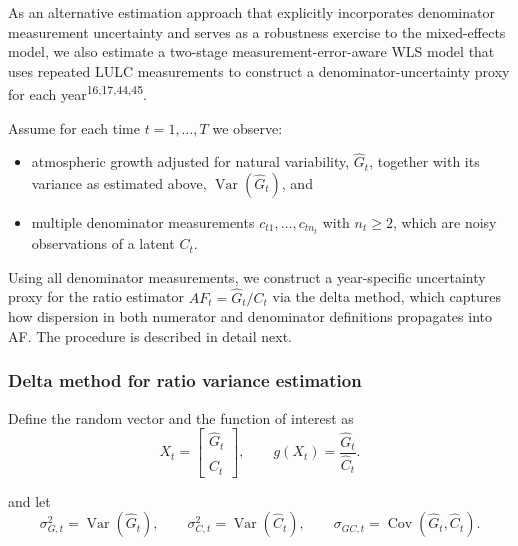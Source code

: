 \documentclass[
  12pt,
  letterpaper,
  DIV=11,
  numbers=noendperiod]{scrartcl}
\begin{document}
As an alternative estimation approach that explicitly incorporates
denominator measurement uncertainty and serves as a robustness exercise
to the mixed-effects model, we also estimate a two-stage
measurement-error-aware WLS model that uses repeated LULC measurements
to construct a denominator-uncertainty proxy for each
year\textsuperscript{16,17,44,45}.

Assume for each time \(t=1,\dots,T\) we observe:

\begin{itemize}
\item
  atmospheric growth adjusted for natural variability, \(\hat{G}_t\),
  together with its variance as estimated above,
  \(\operatorname{Var}(\hat{G}_t)\), and
\item
  multiple denominator measurements \(c_{t1},\dots,c_{t n_t}\) with
  \(n_t \ge 2\), which are noisy observations of a latent \(C_t\).
\end{itemize}

Using all denominator measurements, we construct a year-specific
uncertainty proxy for the ratio estimator \(AF_t = \hat{G}_t/C_t\) via
the delta method, which captures how dispersion in both numerator and
denominator definitions propagates into AF. The procedure is described
in detail next.

\subsubsection*{Delta method for ratio variance
estimation}\label{delta-method-for-ratio-variance-estimation}

Define the random vector and the function of interest as \[
X_t=
\begin{bmatrix}
\hat{G}_t\\
\hat C_t
\end{bmatrix},
\qquad
g(X_t)=\frac{\hat{G}_t}{\hat C_t}.
\]

and let \[
\sigma_{G,t}^2 = \operatorname{Var}(\hat{G}_t),\qquad \sigma_{C,t}^2 = \operatorname{Var}(\hat C_t),\qquad \sigma_{GC,t} = \operatorname{Cov}(\hat{G}_t,\hat C_t).
\]
\end{document}
